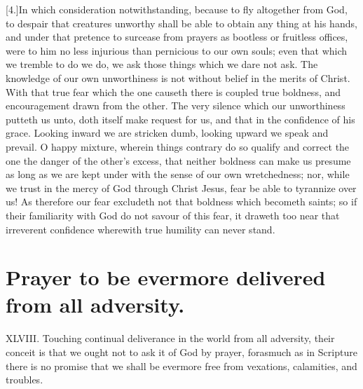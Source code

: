 [4.]In which consideration notwithstanding, because to fly altogether from God, to despair that creatures unworthy shall be able to obtain any thing at his hands, and under that pretence to surcease from prayers as bootless or fruitless offices, were to him no less injurious than pernicious to our own souls; even that which we tremble to do we do, we ask those things which we dare not ask. The knowledge of our own unworthiness is not without belief in the merits of Christ. With that true fear which the one causeth there is coupled true boldness, and encouragement drawn from the other. The very silence which our unworthiness putteth us unto, doth itself make request for us, and that in the confidence of his grace. Looking inward we are stricken dumb, looking upward we speak and prevail. O happy mixture, wherein things contrary do so qualify and correct the one the danger of the other’s excess, that neither boldness can make us presume as long as we are kept under with the sense of our own wretchedness; nor, while we trust in the mercy of God through Christ Jesus, fear be able to tyrannize over us! As therefore our fear excludeth not that boldness which becometh saints; so if their familiarity with God do not savour of this fear, it draweth too near that irreverent confidence wherewith true humility can never stand.


\section*{Prayer to be evermore delivered from all adversity.}
XLVIII. Touching continual deliverance in the world from all adversity, their conceit is that we ought not to ask it of God by prayer, forasmuch as in Scripture there is no promise that we shall be evermore free from vexations, calamities, and troubles.




